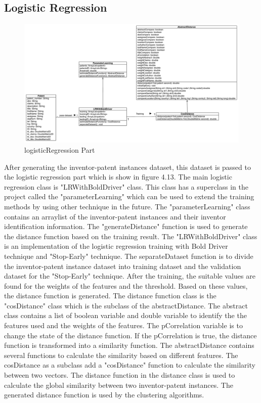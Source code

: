 \subsection{Logistic Regression}
\begin{figure}
\centering
\includegraphics[width=\headwidth]{logisticRegression.pdf}
\caption{logisticRegression Part}
\end{figure}
After generating the inventor-patent instances dataset, this dataset is passed to the logistic regression part which is show in figure 4.13. The main logistic regression class is "LRWithBoldDriver" class. This class has a superclass in the project called the "parameterLearning" which can be used to extend the training methods by using other technique in the future. The "parameterLearning" class contains an arraylist of the inventor-patent instances and their inventor identification information. The "generateDistance" function is used to generate the distance function based on the training result. The "LRWithBoldDriver" class is an implementation of the logistic regression training with Bold Driver technique and "Stop-Early" technique. The separateDataset function is to divide the inventor-patent instance dataset into training dataset and the validation dataset for the "Stop-Early" technique. After the training, the suitable values are found for the weights of the features and the threshold. Based on these values, the distance function is generated. The distance function class is the "cosDistance" class which is the subclass of the abstractDistance. The abstract class contains a list of boolean variable and double variable to identify the the features used and the weights of the features. The pCorrelation variable is to change the state of the distance function. If the pCorrelation is true, the distance function is transformed into a similarity function. The abstractDistance contains several functions to calculate the similarity based on different features. The cosDistance as a subclass add a "cosDistance" function to calculate the similarity between two vectors. The distance function in the distance class is used to calculate the global similarity between two inventor-patent instances. The generated distance function is used by the clustering algorithms.

